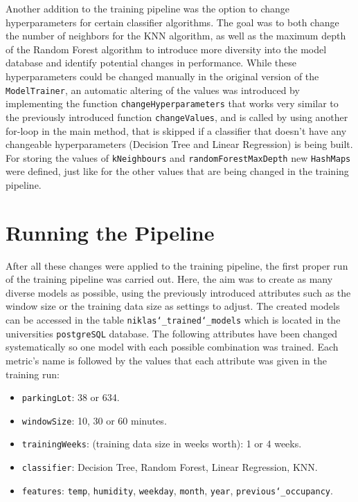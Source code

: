  Another addition to the training pipeline was the option to change hyperparameters for certain classifier algorithms. The goal was to both change the number of neighbors for the KNN algorithm, as well as the maximum depth of the Random Forest algorithm to introduce more diversity into the model database and identify potential changes in performance. While these hyperparameters could be changed manually in the original version of the \texttt{ModelTrainer}, an automatic altering of the values was introduced by implementing the function \texttt{changeHyperparameters} that works very similar to the previously introduced function \texttt{changeValues}, and is called by using another for-loop in the main method, that is skipped if a classifier that doesn’t have any changeable hyperparameters (Decision Tree and Linear Regression) is being built. For storing the values of \texttt{kNeighbours} and \texttt{randomForestMaxDepth} new \texttt{HashMaps} were defined, just like for the other values that are being changed in the training pipeline. 
 
 
 
 \section{Running the Pipeline}
 
 After all these changes were applied to the training pipeline, the first proper run of the training pipeline was carried out. Here, the aim was to create as many diverse models as possible, using the previously introduced attributes such as the window size or the training data size as settings to adjust. The created models can be accessed in the table \texttt{niklas\char`_trained\char`_models} which is located in the universities \texttt{postgreSQL} database. The following attributes have been changed systematically so one model with each possible combination was trained. Each metric’s name is followed by the values that each attribute was given in the training run:
 
 \begin{itemize}
 	\item \texttt{parkingLot}: 38 or 634.
\item \texttt{windowSize}: 10, 30 or 60 minutes.
\item \texttt{trainingWeeks}: (training data size in weeks worth): 1 or 4 weeks. 
\item \texttt{classifier}: Decision Tree, Random Forest, Linear Regression, KNN.
\item \texttt{features}: \texttt{temp}, \texttt{humidity}, \texttt{weekday}, \texttt{month}, \texttt{year}, \texttt{previous\char`_occupancy}.
 \end{itemize}
 
